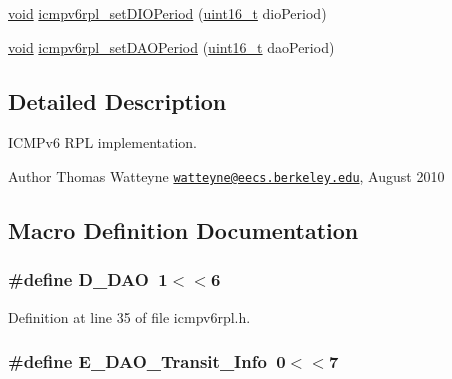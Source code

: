 \begin{DoxyCompactItemize}
\item 
\hyperlink{usb__devapi_8h_afabf60e7f57651d6d595a02c75f07cd0}{void} \hyperlink{group___i_c_m_pv6_r_p_l_ga147bdcc7d626f8c9c004c621c457268a}{icmpv6rpl\+\_\+set\+D\+I\+O\+Period} (\hyperlink{_p_e___types_8h_a1f1825b69244eb3ad2c7165ddc99c956}{uint16\+\_\+t} dio\+Period)
\item 
\hyperlink{usb__devapi_8h_afabf60e7f57651d6d595a02c75f07cd0}{void} \hyperlink{group___i_c_m_pv6_r_p_l_gae337d80795de45ac911449e4a8b4a13e}{icmpv6rpl\+\_\+set\+D\+A\+O\+Period} (\hyperlink{_p_e___types_8h_a1f1825b69244eb3ad2c7165ddc99c956}{uint16\+\_\+t} dao\+Period)
\end{DoxyCompactItemize}


\subsection{Detailed Description}
I\+C\+M\+Pv6 R\+PL implementation. 

\begin{DoxyAuthor}{Author}
Thomas Watteyne \href{mailto:watteyne@eecs.berkeley.edu}{\tt watteyne@eecs.\+berkeley.\+edu}, August 2010 
\end{DoxyAuthor}


\subsection{Macro Definition Documentation}
\subsubsection[{\texorpdfstring{D\+\_\+\+D\+AO}{D_DAO}}]{\setlength{\rightskip}{0pt plus 5cm}\#define D\+\_\+\+D\+AO~1$<$$<$6}\hypertarget{group___i_c_m_pv6_r_p_l_ga6068b74c52b57686cdd3af054379ab31}{}\label{group___i_c_m_pv6_r_p_l_ga6068b74c52b57686cdd3af054379ab31}


Definition at line 35 of file icmpv6rpl.\+h.

\subsubsection[{\texorpdfstring{E\+\_\+\+D\+A\+O\+\_\+\+Transit\+\_\+\+Info}{E_DAO_Transit_Info}}]{\setlength{\rightskip}{0pt plus 5cm}\#define E\+\_\+\+D\+A\+O\+\_\+\+Transit\+\_\+\+Info~0$<$$<$7}\hypertarget{group___i_c_m_pv6_r_p_l_ga695843fab4443b9208b9b3f63668e4b3}{}\label{group___i_c_m_pv6_r_p_l_ga695843fab4443b9208b9b3f63668e4b3}


